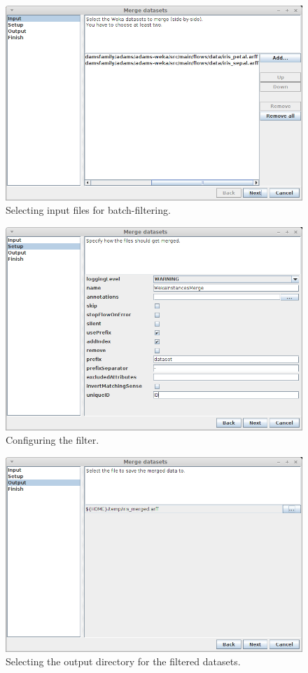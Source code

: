 \begin{figure}[htb]
  \centering
  \includegraphics[width=12.0cm]{images/merge_datasets1.png}
  \caption{Selecting input files for batch-filtering.}
  \label{merge_datasets1}
\end{figure}

\begin{figure}[htb]
  \centering
  \includegraphics[width=12.0cm]{images/merge_datasets2.png}
  \caption{Configuring the filter.}
  \label{merge_datasets2}
\end{figure}

\begin{figure}[htb]
  \centering
  \includegraphics[width=12.0cm]{images/merge_datasets3.png}
  \caption{Selecting the output directory for the filtered datasets.}
  \label{merge_datasets3}
\end{figure}

